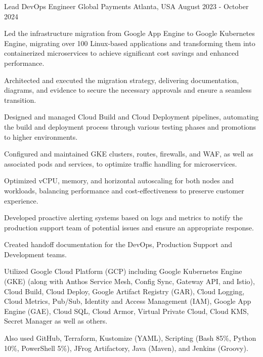 \textcolor{awesome}{\raisebox{0.1\height}{\faBriefcase\thinspace}}


\begin{cventries}

  \cventry
    {Lead DevOps Engineer} %
    {Global Payments} %
    {Atlanta, USA} %
    {August 2023 - October 2024} %
    {
      \begin{cvitems} %
        \item {Led the infrastructure migration from Google App Engine to Google Kubernetes Engine, migrating over 100 Linux-based applications and transforming them into containerized microservices to achieve significant cost savings and enhanced performance.}
        \item {Architected and executed the migration strategy, delivering documentation, diagrams, and evidence to secure the necessary approvals and ensure a seamless transition.}
        \item {Designed and managed Cloud Build and Cloud Deployment pipelines, automating the build and deployment process through various testing phases and promotions to higher environments.}
        \item {Configured and maintained GKE clusters, routes, firewalls, and WAF, as well as associated pods and services, to optimize traffic handling for microservices.}
        \item {Optimized vCPU, memory, and horizontal autoscaling for both nodes and workloads, balancing performance and cost-effectiveness to preserve customer experience.}
        \item {Developed proactive alerting systems based on logs and metrics to notify the production support team of potential issues and ensure an appropriate response.}
        \item {Created handoff documentation for the DevOps, Production Support and Development teams.}
        \item {Utilized Google Cloud Platform (GCP) including Google Kubernetes Engine (GKE) (along with Anthos Service Mesh, Config Sync, Gateway API, and Istio), Cloud Build, Cloud Deploy, Google Artifact Registry (GAR), Cloud Logging, Cloud Metrics, Pub/Sub, Identity and Access Management (IAM), Google App Engine (GAE), Cloud SQL, Cloud Armor, Virtual Private Cloud, Cloud KMS, Secret Manager as well as others.}
        \item {Also used GitHub, Terraform, Kustomize (YAML), Scripting (Bash 85\%, Python 10\%, PowerShell 5\%), JFrog Artifactory, Java (Maven), and Jenkins (Groovy).}
      \end{cvitems}
    }


\end{cventries}
